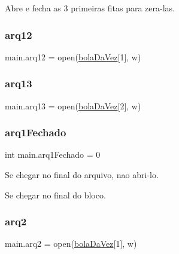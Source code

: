 Abre e fecha as 3 primeiras fitas para zera-\/las. 

\mbox{\label{namespacemain_a3313e71a61224e6a3a7e3b850ef85783}} 
\subsubsection{\texorpdfstring{arq12}{arq12}}
{\footnotesize\ttfamily main.\+arq12 = open(\hyperlink{namespacemain_a1a062cd836b3711b8674874524bf97dc}{bola\+Da\+Vez}\mbox{[}1\mbox{]}, \textquotesingle{}w\textquotesingle{})}

\mbox{\label{namespacemain_a277d12b6fb93bf74b1dffd24e31fb132}} 
\subsubsection{\texorpdfstring{arq13}{arq13}}
{\footnotesize\ttfamily main.\+arq13 = open(\hyperlink{namespacemain_a1a062cd836b3711b8674874524bf97dc}{bola\+Da\+Vez}\mbox{[}2\mbox{]}, \textquotesingle{}w\textquotesingle{})}

\mbox{\label{namespacemain_a338ce95673b10f656d8a25a8e07d9435}} 
\subsubsection{\texorpdfstring{arq1\+Fechado}{arq1Fechado}}
{\footnotesize\ttfamily int main.\+arq1\+Fechado = 0}



Se chegar no final do arquivo, nao abri-\/lo. 

Se chegar no final do bloco. \mbox{\label{namespacemain_aa46a3cc27be1d87d4cd439ea3fb0f99e}} 
\subsubsection{\texorpdfstring{arq2}{arq2}}
{\footnotesize\ttfamily main.\+arq2 = open(\hyperlink{namespacemain_a1a062cd836b3711b8674874524bf97dc}{bola\+Da\+Vez}\mbox{[}1\mbox{]}, \textquotesingle{}w\textquotesingle{})}

